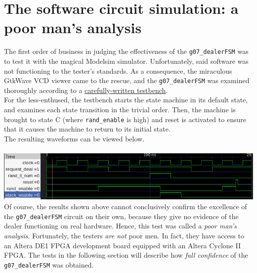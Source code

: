 \documentclass[12pt]{report}
\begin{document}
\section*{The software circuit simulation: a poor man's analysis}
The first order of business in judging the effectiveness of the \texttt{g07\_dealerFSM} was to test
it with the magical Modelsim simulator. Unfortunately, said software was not functioning to the
tester's standards. As a consequence, the miraculous GtkWave VCD viewer came to the rescue, and the
\texttt{g07\_dealerFSM} was examined thoroughly according to a
\hyperref[a:dealertst]{carefully-written testbench}. \\For the less-enthused, the testbench starts the
state machine in its default state, and examines each state transition in the trivial order. Then,
the machine is brought to state C (where \texttt{rand\_enable} is high) and reset is activated to
ensure that it causes the machine to return to its initial state.\\
The resulting waveforms can be viewed below.\\\\
\includegraphics[scale=0.75]{dealertestcropped}
Of course, the results shown above cannot conclusively confirm the excellence of the
\texttt{g07\_dealerFSM} circuit on their own, because they give no evidence of the dealer
functioning on real hardware. Hence, this test was called a \textit{poor man's
analysis}. Fortunately, the testers \textit{are not} poor men. In fact, they have access to an
Altera DE1 FPGA development board equipped with an Altera Cyclone II FPGA. The tests in the
following section will describe how \textit{full confidence} of the \texttt{g07\_dealerFSM} was
obtained.
\end{document}
